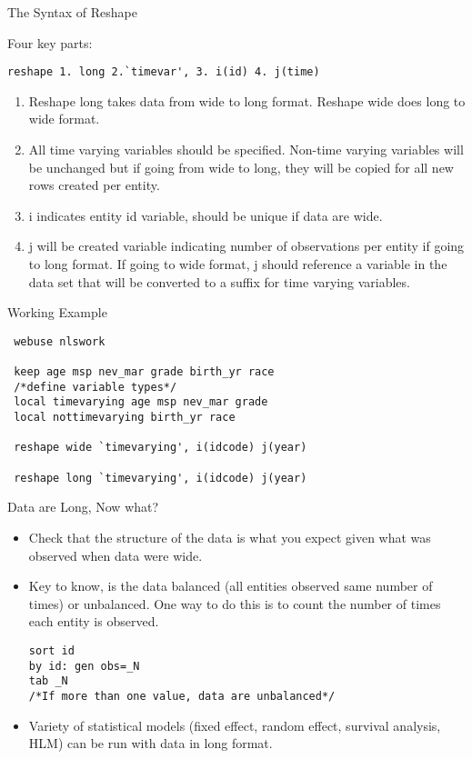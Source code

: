 \documentclass{beamer}
\begin{document}
\begin{frame}[fragile]{The Syntax of Reshape}

Four key parts:
\begin{verbatim}
reshape 1. long 2.`timevar', 3. i(id) 4. j(time)
\end{verbatim}
\begin{small}
\begin{enumerate}
    \item Reshape long takes data from wide to long format.  Reshape wide does long to wide format.
    \item All time varying variables should be specified.  Non-time varying variables will be unchanged but if going from wide to long, they will be copied for all new rows created per entity.
    \item i indicates entity id variable, should be unique if data are wide.
    \item j will be created variable indicating number of observations per entity if going to long format.  If going to wide format, j should reference a variable in the data set that will be converted to a suffix for time varying variables.
\end{enumerate}
\end{small}
\end{frame}

\begin{frame}[fragile]{Working Example}

 \begin{verbatim}
 webuse nlswork
 
 keep age msp nev_mar grade birth_yr race
 /*define variable types*/
 local timevarying age msp nev_mar grade 
 local nottimevarying birth_yr race

 reshape wide `timevarying', i(idcode) j(year)
 
 reshape long `timevarying', i(idcode) j(year)
 \end{verbatim}
\end{frame}

\begin{frame}[fragile]{Data are Long, Now what?}
\begin{itemize}
\item Check that the structure of the data is what you expect given what was observed when data were wide.
\item Key to know, is the data balanced (all entities observed same number of times) or unbalanced.  One way to do this is to count the number of times each entity is observed.
\begin{verbatim}
sort id
by id: gen obs=_N
tab _N
/*If more than one value, data are unbalanced*/
\end{verbatim}
\item Variety of statistical models (fixed effect, random effect, survival analysis, HLM) can be run with data in long format.
\end{itemize}
\end{frame}
\end{document}
